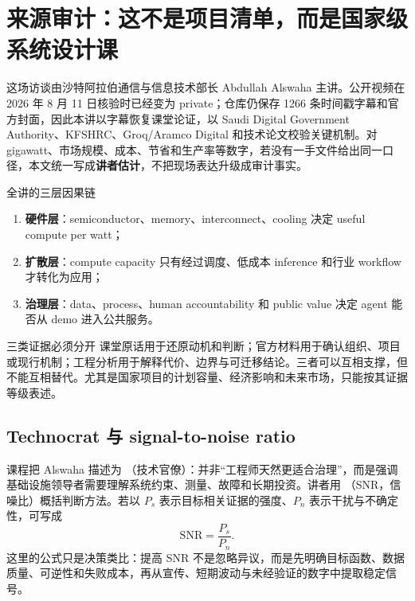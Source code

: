 \documentclass[a4paper]{article}
\begin{document}
\makecscover

\section{来源审计：这不是项目清单，而是国家级系统设计课}

这场访谈由沙特阿拉伯通信与信息技术部长 Abdullah Alswaha 主讲。公开视频在 2026 年 8 月 11 日核验时已经变为 private；仓库仍保存 1266 条时间戳字幕和官方封面，因此本讲以字幕恢复课堂论证，以 Saudi Digital Government Authority、KFSHRC、Groq/Aramco Digital 和技术论文校验关键机制。对 gigawatt、市场规模、成本、节省和生产率等数字，若没有一手文件给出同一口径，本文统一写成\textbf{讲者估计}，不把现场表达升级成审计事实。

\begin{importantbox}{全讲的三层因果链}
\begin{enumerate}
  \item \textbf{硬件层}：semiconductor、memory、interconnect、cooling 决定 useful compute per watt；
  \item \textbf{扩散层}：compute capacity 只有经过调度、低成本 inference 和行业 workflow 才转化为应用；
  \item \textbf{治理层}：data、process、human accountability 和 public value 决定 agent 能否从 demo 进入公共服务。
\end{enumerate}
\end{importantbox}

\begin{warningbox}{三类证据必须分开}
课堂原话用于还原动机和判断；官方材料用于确认组织、项目或现行机制；工程分析用于解释代价、边界与可迁移结论。三者可以互相支撑，但不能互相替代。尤其是国家项目的计划容量、经济影响和未来市场，只能按其证据等级表述。
\end{warningbox}

\subsection{Technocrat 与 signal-to-noise ratio}

课程把 Alswaha 描述为 （技术官僚）：并非“工程师天然更适合治理”，而是强调基础设施领导者需要理解系统约束、测量、故障和长期投资。讲者用 （SNR，信噪比）概括判断方法。若以 $P_s$ 表示目标相关证据的强度、$P_n$ 表示干扰与不确定性，可写成
\[
\mathrm{SNR}=\frac{P_s}{P_n}.
\]
这里的公式只是决策类比：提高 SNR 不是忽略异议，而是先明确目标函数、数据质量、可逆性和失败成本，再从宣传、短期波动与未经验证的数字中提取稳定信号。
\end{document}
